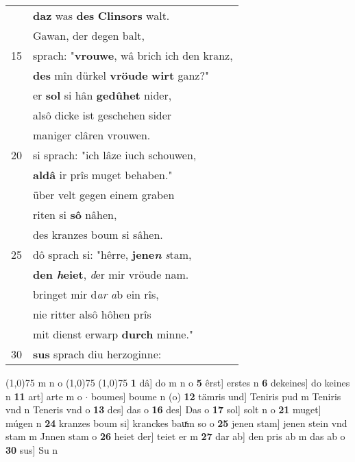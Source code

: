 \documentclass[8pt,a4paper,notitlepage]{article}
\begin{document}
\begin{table}[ht]
\begin{minipage}[t]{0.5\linewidth}
\begin{tabular}{rl}
 & \textbf{daz} was \textbf{des} \textbf{Clinsors} walt.\\ 
 & Gawan, der degen balt,\\ 
15 & sprach: "\textbf{vrouwe}, wâ brich ich den kranz,\\ 
 & \textbf{des} mîn dürkel \textbf{vröude} \textbf{wirt} ganz?"\\ 
 & er \textbf{sol} si hân \textbf{gedûhet} nider,\\ 
 & alsô dicke ist geschehen sider\\ 
 & maniger clâren vrouwen.\\ 
20 & si sprach: "ich lâze iuch schouwen,\\ 
 & \textbf{aldâ} ir prîs muget behaben."\\ 
 & über velt gegen einem graben\\ 
 & riten si \textbf{sô} nâhen,\\ 
 & des kranzes boum si sâhen.\\ 
25 & dô sprach si: "hêrre, \textbf{jene\textit{n}} \textit{s}tam,\\ 
 & \textbf{den \textit{h}eiet}, \textit{d}er mir vröude nam.\\ 
 & bringet mir d\textit{ar a}b ein rîs,\\ 
 & nie ritter alsô hôhen prîs\\ 
 & mit dienst erwarp \textbf{durch} minne."\\ 
30 & \textbf{sus} sprach diu herzoginne:\\ 
\end{tabular}
\scriptsize
\line(1,0){75} \newline
m n o \newline
\line(1,0){75} \newline
\newline
\line(1,0){75} \newline
\textbf{1} dâ] do m n o \textbf{5} êrst] erstes n \textbf{6} dekeines] do keines n \textbf{11} art] arte m o  $\cdot$ boumes] boume n (o) \textbf{12} tämris und] Teniris pud m Teniris vnd n Teneris vnd o \textbf{13} des] das o \textbf{16} des] Das o \textbf{17} sol] solt n o \textbf{21} muget] múgen n \textbf{24} kranzes boum si] kranckes bauͯm so o \textbf{25} jenen stam] jenen stein vnd stam m Jnnen stam o \textbf{26} heiet der] teiet er m \textbf{27} dar ab] den pris ab m das ab o \textbf{30} sus] Su n \newline
\end{minipage}
\end{table}
\newpage
\end{document}
